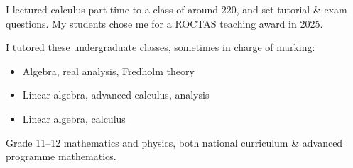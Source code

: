 
\smallskip
I lectured calculus part-time to a class of around 220, and set tutorial \& exam questions. My
students chose me for a ROCTAS teaching award in 2025.

\divider

\smallskip
I \href{https://dariotrinchero.github.io/teaching/2018-math-demi}{tutored}
these undergraduate classes, sometimes in charge of marking:
\smallskip
\begin{itemize}
	\setlength{\itemsep}{0.1em}
	\item {} Algebra, real analysis, Fredholm theory
	\item {} Linear algebra, advanced calculus, analysis
	\item {} Linear algebra, calculus
\end{itemize}

\ifindustry\else %
	\vspace{-0.3em}
	\divider

	\smallskip
	Grade 11--12 mathematics and physics, both national curriculum \& advanced programme mathematics.
\fi %
